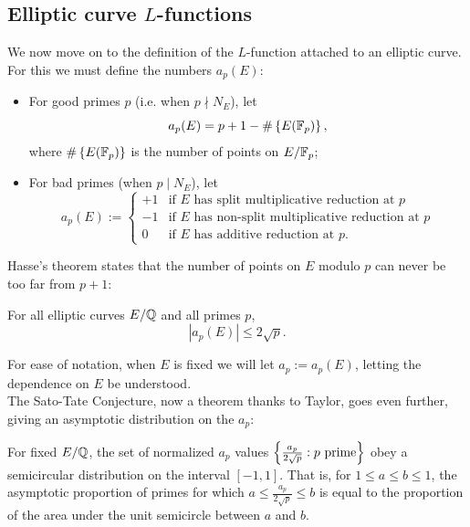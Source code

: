 \subsection{Elliptic curve $L$-functions}

We now move on to the definition of the $L$-function attached to an elliptic curve. For this we must define the numbers $a_p(E)$:
\begin{definition}\label{def:a_p} \mbox{}
\begin{itemize}
\item For good primes $p$ (i.e. when $p \nmid N_E$), let
\begin{equation}
a_p(E) = p+1-\#\left\{E(\mathbb{F}_p)\right\},
\end{equation}
where $\#\left\{E(\mathbb{F}_p)\right\}$ is the number of points on $E/\mathbb{F}_p$;
\item For bad primes (when $p \mid N_E$), let
\begin{equation}
a_p(E) := \begin{cases}
+1 & \text{if $E$ has split multiplicative reduction at $p$} \\
-1 & \text{if $E$ has non-split multiplicative reduction at $p$} \\
0 & \text{if $E$ has additive reduction at $p$.}
\end{cases}
\end{equation}
\end{itemize}
\end{definition}

Hasse's theorem states that the number of points on $E$ modulo $p$ can never be too far from $p+1$:
\begin{theorem}[Hasse, 1936]
For all elliptic curves $E/\mathbb{Q}$ and all primes $p$,
\begin{equation}
|a_p(E)| \le 2\sqrt{p}.
\end{equation}
\end{theorem}

For ease of notation, when $E$ is fixed we will let $a_p := a_p(E)$, letting the dependence on $E$ be understood. \\

The Sato-Tate Conjecture, now a theorem thanks to Taylor, goes even further, giving an asymptotic distribution on the $a_p$:
\begin{theorem}[Taylor, 2006-]
For fixed $E/\mathbb{Q}$, the set of normalized $a_p$ values $\left\{\frac{a_p}{2\sqrt{p}}: p \text{ prime}\right\}$ obey a semicircular distribution on the interval $[-1,1]$. That is, for $1\le a \le b \le 1$, the asymptotic proportion of primes for which $a \le \frac{a_p}{2\sqrt{p}} \le b$ is equal to the proportion of the area under the unit semicircle between $a$ and $b$.
\end{theorem}

